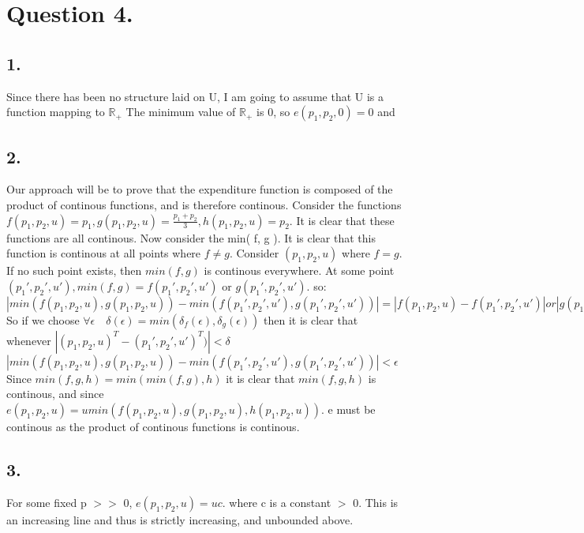 \documentclass[10pt, letterpaper]{paper}
\begin{document}
\section*{Question 4.}
\subsection*{1.}
Since there has been no structure laid on U, I am going to assume that U is a function mapping to $\mathbb{R}_+$
\newline
The minimum value of $\mathbb{R}_+$ is 0, so $e(p_1,p_2,0) = 0$ and  
\subsection*{2.}
Our approach will be to prove that the expenditure function is composed of the product of continous functions, and is therefore continous.
\newline
Consider the functions $f(p_1,p_2,u) = p_1, g(p_1,p_2,u) = \frac{p_1 + p_2}{3}, h(p_1,p_2,u) = p_2$. It is clear that these functions are all continous.
Now consider the min( f, g ). It is clear that this function is continous at all points where $f \neq g$. Consider $(p_1,p_2,u)$ where $f = g$. If no such point exists, then $min(f,g)$ is continous everywhere.
At some point $(p_1', p_2', u'), min( f,g) = f( p_1', p_2', u')$  or  $g( p_1', p_2', u' )$. so: $| min( f(p_1,p_2,u),g(p_1,p_2,u)) - min( f(p_1', p_2', u'), g(p_1', p_2', u') ) | = |f(p_1,p_2,u) - f(p_1', p_2', u')| or |g(p_1,p_2,u) - g(p_1', p_2', u')|$
So if we choose $\forall \epsilon \quad \delta(\epsilon) = min( \delta_f(\epsilon), \delta_g(\epsilon) )$ then it is clear that whenever $|(p_1,p_2,u)^T - (p_1',p_2',u')^T)| < \delta$
\newline
$| min( f(p_1,p_2,u),g(p_1,p_2,u)) - min( f(p_1', p_2', u'), g(p_1', p_2', u') ) | < \epsilon$
\newline
Since $min(f,g,h) = min( min(f,g),h)$ it is clear that $min( f,g,h)$ is continous, and since $e(p_1,p_2,u) = u min(f(p_1,p_2,u),g(p_1,p_2,u),h(p_1,p_2,u)).$
\newline
e must be continous as the product of continous functions is continous.
\subsection*{3.}
For some fixed p $>>$ 0, $e( p_1, p_2, u ) = u c.$ where c is a constant $>$ 0. This is an increasing line and thus is strictly increasing, and unbounded above. 
\end{document}
